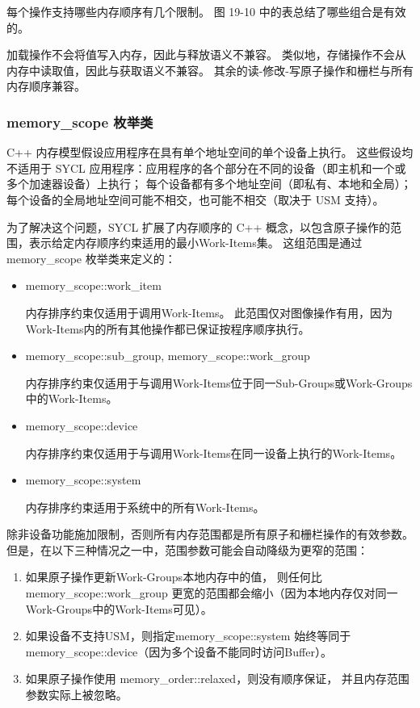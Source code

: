 每个操作支持哪些内存顺序有几个限制。 图 19-10 中的表总结了哪些组合是有效的。

加载操作不会将值写入内存，因此与释放语义不兼容。 类似地，存储操作不会从内存中读取值，因此与获取语义不兼容。 
其余的读-修改-写原子操作和栅栏与所有内存顺序兼容。

\subsubsection{memory\_scope 枚举类}
C++ 内存模型假设应用程序在具有单个地址空间的单个设备上执行。 
这些假设均不适用于 SYCL 应用程序：应用程序的各个部分在不同的设备（即主机和一个或多个加速器设备）上执行； 
每个设备都有多个地址空间（即私有、本地和全局）； 
每个设备的全局地址空间可能不相交，也可能不相交（取决于 USM 支持）。

为了解决这个问题，SYCL 扩展了内存顺序的 C++ 概念，以包含原子操作的范围，表示给定内存顺序约束适用的最小Work-Items集。 
这组范围是通过 memory\_scope 枚举类来定义的：

\begin{itemize}
	\item memory\_scope::work\_item

内存排序约束仅适用于调用Work-Items。 此范围仅对图像操作有用，因为Work-Items内的所有其他操作都已保证按程序顺序执行。

	\item memory\_scope::sub\_group, memory\_scope::work\_group

内存排序约束仅适用于与调用Work-Items位于同一Sub-Groups或Work-Groups中的Work-Items。

	\item memory\_scope::device

内存排序约束仅适用于与调用Work-Items在同一设备上执行的Work-Items。

	\item memory\_scope::system

内存排序约束适用于系统中的所有Work-Items。
\end{itemize}

除非设备功能施加限制，否则所有内存范围都是所有原子和栅栏操作的有效参数。 
但是，在以下三种情况之一中，范围参数可能会自动降级为更窄的范围：

\begin{enumerate}
	\item 如果原子操作更新Work-Groups本地内存中的值，
	则任何比 memory\_scope::work\_group 更宽的范围都会缩小（因为本地内存仅对同一Work-Groups中的Work-Items可见）。

	\item 如果设备不支持USM，则指定memory\_scope::system 
	始终等同于memory\_scope::device（因为多个设备不能同时访问Buffer）。

	\item 如果原子操作使用 memory\_order::relaxed，则没有顺序保证，
	并且内存范围参数实际上被忽略。
\end{enumerate}

